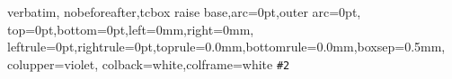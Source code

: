 \usepackage{fancyhdr}
    \pagestyle{fancy}
    \fancyhf{}
    \makeatletter
    \renewcommand{\title}[1]{\gdef\@title{#1}\gdef\titlestring{#1}}
    \renewcommand{\maketitle}{\newpage\null\thispagestyle{plain}
    \vskip1em\noindent{\Huge\titlestring}\vskip3em}
    \makeatother
    \renewcommand{\headrulewidth}{0pt}
    \fancyhead[L]{\today}

\usepackage[shortlabels]{enumitem}

\usepackage{microtype}
\usepackage{textcomp}           %



\renewcommand\arraystretch{1.3} %

\def\dmsdif{\,\mathrm{d}}
\newcommand*{\dmsNN}{\char"2115\relax}
\newcommand*{\dmsbar}[1]{\mkern1.5mu\overline{\mkern-1.5mu#1\mkern-1.5mu}\mkern1.5mu}

\usepackage{tcolorbox}

{verbatim, nobeforeafter,tcbox raise base,arc=0pt,outer arc=0pt,
top=0pt,bottom=0pt,left=0mm,right=0mm,
leftrule=0pt,rightrule=0pt,toprule=0.0mm,bottomrule=0.0mm,boxsep=0.5mm,
colupper=violet, colback=white,colframe=white}
{\lstinline[language=#1]^#2^}

\endinput
